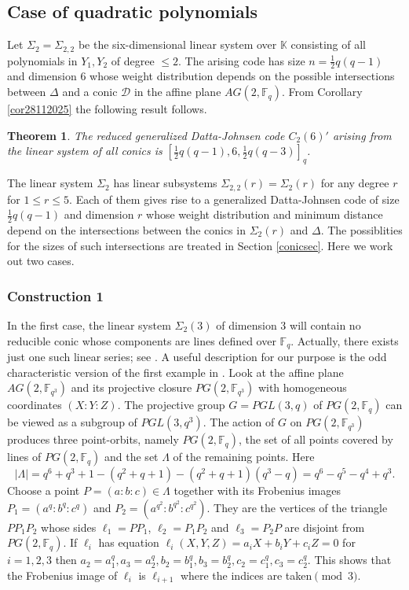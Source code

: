 \documentclass[sn-mathphys-num]{sn-jnl}%
\newtheorem{theorem}{Theorem}
\begin{document}
\subsection{Case of quadratic polynomials}\label{exa}
Let $\Sigma_2=\Sigma_{2,2}$ be the six-dimensional linear system over $\mathbb{K}$ consisting of all polynomials in $Y_1,Y_2$ of degree $\le 2$. The arising code has size $n=\frac{1}{2}q(q-1)$ and dimension $6$ whose weight distribution depends on the  possible intersections between $\Delta$ and a conic $\mathcal{D}$ in the affine plane $AG(2,\mathbb{F}_q)$. From Corollary \ref{cor28112025} the following result follows. 

\begin{theorem}
\label{th18032025} The reduced generalized Datta-Johnsen code $C_2(6)'$ arising from the linear system of all conics is  $\left[\frac{1}{2} q(q-1),6,\frac{1}{2}q(q-3)\right]_q$.
\end{theorem}
The linear system $\Sigma_2$ has linear subsystems $\Sigma_{2,2}(r)=\Sigma_2(r)$ for any degree $r$ for $1\le r \le 5$. Each of them gives rise to a generalized Datta-Johnsen code of size $\frac{1}{2}q(q-1)$ and dimension $r$ whose weight distribution and minimum distance depend on the intersections between the conics in $\Sigma_2(r)$ and $\Delta$. The possiblities for the sizes of such intersections are treated in Section \ref{conicsec}.
Here we work out two cases.

\subsubsection{Construction 1} In the first case, the linear system $\Sigma_2(3)$ of dimension $3$ will contain no reducible conic whose components are lines defined over $\mathbb{F}_q$. Actually, there exists just one such linear series;
see \cite{AL}. A useful description for our purpose is the odd characteristic version of the first example in \cite[Section 3.2]{GKNPS}. Look at the affine plane $AG(2,\mathbb{F}_{q^3})$ and its projective closure $PG(2,\mathbb{F}_{q^3})$ with homogeneous coordinates $(X:Y:Z)$. The projective  group $G=PGL(3,q)$ of $PG(2,\mathbb{F}_q)$ can be viewed as a subgroup of $PGL(3,q^3)$. The action of $G$ on $PG(2,\mathbb{F}_{q^3})$ produces three point-orbits, namely $PG(2,\mathbb{F}_q)$, the set of all points covered by lines of $PG(2,\mathbb{F}_q)$ and the set $\Lambda$ of the remaining
points. Here
\begin{equation*}
\label{eqA080125}
|\Lambda|=q^6+q^3+1-(q^2+q+1)-(q^2+q+1)(q^3-q)=q^6-q^5-q^4+q^3.
\end{equation*}
Choose a point $P=(a:b:c)\in\Lambda$ together with its Frobenius images $P_1=(a^q:b^q:c^q)$ and $P_2=(a^{q^2}:b^{q^2}:c^{q^2})$. They are the vertices of the triangle $PP_1P_2$ whose sides $\ell_1=PP_1$, $\ell_2=P_1P_2$ and $\ell_3=P_2P$ are disjoint from $PG(2,\mathbb{F}_q)$. If $\ell_i$ has equation $\ell_i(X,Y,Z)=a_iX+b_iY+c_iZ=0$ for $i=1,2,3$ then
$a_2=a_1^q,a_3=a_2^q,b_2=b_1^q,b_3=b_2^q,c_2=c_1^q,c_3=c_2^q$. This shows that the Frobenius image of $\ell_i$ is $\ell_{i+1}$ where the indices are taken$\pmod{3}$.
\end{document}
